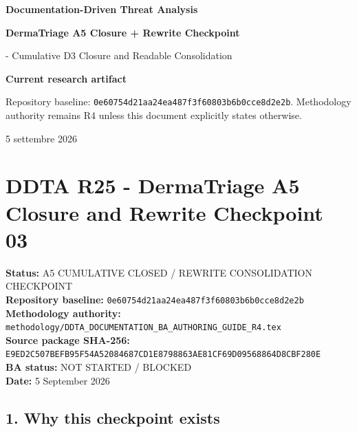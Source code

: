 \documentclass[11pt,a4paper]{article}
\begin{document}
\begin{titlepage}
\thispagestyle{empty}
\vspace*{10mm}
{\sffamily\bfseries\color{DDTANavy}\fontsize{15}{18}\selectfont Documentation-Driven Threat Analysis}\par
\vspace{5mm}
{\sffamily\bfseries\color{DDTANavy}\fontsize{27}{31}\selectfont DermaTriage A5 Closure + Rewrite Checkpoint}\par
\vspace{2mm}
{\sffamily\color{DDTABlue}\fontsize{17}{21} - Cumulative D3 Closure and Readable Consolidation}\par
\vspace{10mm}
\begin{tcolorbox}[enhanced,arc=3pt,boxrule=0pt,colback=DDTANavy,left=12pt,right=12pt,top=10pt,bottom=10pt]
{\color{white}\sffamily\bfseries Current research artifact}\par
{\color{white!88}\small Repository baseline: \texttt{0e60754d21aa24ea487f3f60803b6b0cce8d2e2b}. Methodology authority remains R4 unless this document explicitly states otherwise.}
\end{tcolorbox}
\vfill
{\sffamily\small\color{DDTAGray} 5 settembre 2026}
\end{titlepage}
\tableofcontents
\clearpage
\section{DDTA R25 - DermaTriage A5 Closure and Rewrite Checkpoint
03}\label{ddta-r25---dermatriage-a5-closure-and-rewrite-checkpoint-03}

\textbf{Status:} A5 CUMULATIVE CLOSED / REWRITE CONSOLIDATION
CHECKPOINT\\
\textbf{Repository baseline:}
\texttt{0e60754d21aa24ea487f3f60803b6b0cce8d2e2b}\\
\textbf{Methodology authority:}
\texttt{methodology/DDTA\_DOCUMENTATION\_BA\_AUTHORING\_GUIDE\_R4.tex}\\
\textbf{Source package SHA-256:}
\texttt{E9ED2C507BEFB95F54A52084687CD1E8798863AE81CF69D09568864D8CBF280E}\\
\textbf{BA status:} NOT STARTED / BLOCKED\\
\textbf{Date:} 5 September 2026

\subsection{1. Why this checkpoint
exists}\label{1-why-this-checkpoint-exists}
\end{document}
